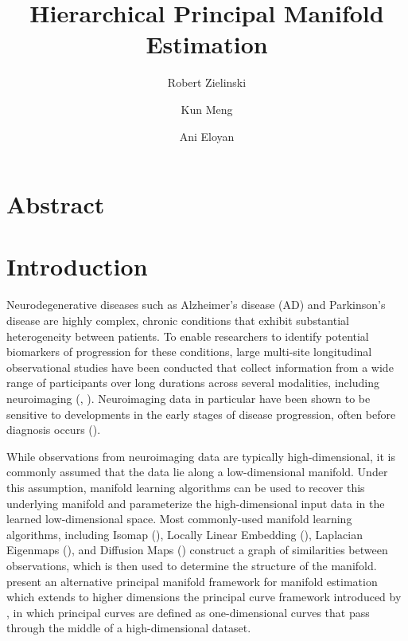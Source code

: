 \documentclass[11pt,reqno]{article}
\theoremstyle{definition}
\begin{document}
\title{Hierarchical Principal Manifold Estimation}
\author[1]{Robert Zielinski}
\author[2]{Kun Meng}
\author[1]{Ani Eloyan}



\maketitle

\doublespacing

\section*{Abstract} \label{s:abstract}

\section{Introduction} \label{s:hpme_intro}

Neurodegenerative diseases such as Alzheimer's disease (AD) and Parkinson's disease are highly complex, chronic conditions that exhibit substantial heterogeneity between patients. To enable researchers to identify potential biomarkers of progression for these conditions, large multi-site longitudinal observational studies have been conducted that collect information from a wide range of participants over long durations across several modalities, including neuroimaging (\cite{muellerWaysEarlyDiagnosis2005}, \cite{marekParkinsonProgressionMarker2011}). Neuroimaging data in particular have been shown to be sensitive to developments in the early stages of disease progression, often before diagnosis occurs (\cite{jackHypotheticalModelDynamic2010}).

While observations from neuroimaging data are typically high-dimensional, it is commonly assumed that the data lie along a low-dimensional manifold. Under this assumption, manifold learning algorithms can be used to recover this underlying manifold and parameterize the high-dimensional input data in the learned low-dimensional space. Most commonly-used manifold learning algorithms, including Isomap (\cite{tenenbaumGlobalGeometricFramework2000}), Locally Linear Embedding (\cite{roweisNonlinearDimensionalityReduction2000}), Laplacian Eigenmaps (\cite{belkinLaplacianEigenmapsDimensionality2003}), and Diffusion Maps (\cite{coifmanDiffusionMaps2006}) construct a graph of similarities between observations, which is then used to determine the structure of the manifold. \cite{mengPrincipalManifoldEstimation2021} present an alternative principal manifold framework for manifold estimation which extends to higher dimensions the principal curve framework introduced by \cite{hastiePrincipalCurves1989}, in which principal curves are defined as one-dimensional curves that pass through the middle of a high-dimensional dataset. 
\end{document}
